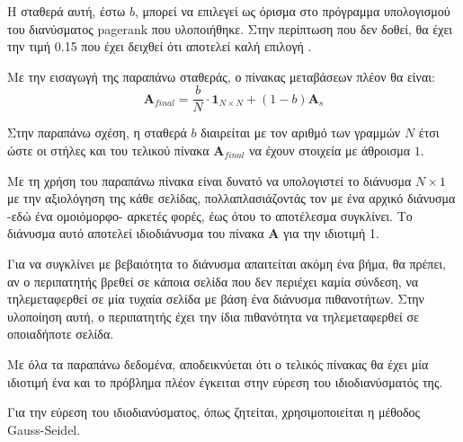 Η σταθερά αυτή, έστω $b$, μπορεί να επιλεγεί ως όρισμα στο πρόγραμμα υπολογισμού του διανύσματος pagerank που υλοποιήθηκε. Στην περίπτωση που δεν δοθεί, θα έχει την τιμή 0.15 που έχει δειχθεί ότι αποτελεί καλή επιλογή \parencite{brin1998anatomy}.

Με την εισαγωγή της παραπάνω σταθεράς, ο πίνακας μεταβάσεων πλέον θα είναι:
\[
  \bm{A}_{final} = \frac{b}{N}\cdot\bm{1}_{N\times N}+(1-b)\bm{A}_s
\]

Στην παραπάνω σχέση, η σταθερά $b$ διαιρείται με τον αριθμό των γραμμών $N$ έτσι ώστε οι στήλες και του τελικού πίνακα $\bm{A}_{final}$ να έχουν στοιχεία με άθροισμα $1$.

Με τη χρήση του παραπάνω πίνακα είναι δυνατό να υπολογιστεί το διάνυσμα $N\times1$ με την αξιολόγηση της κάθε σελίδας, πολλαπλασιάζοντάς τον με ένα αρχικό διάνυσμα -εδώ ένα ομοιόμορφο- αρκετές φορές, έως ότου το αποτέλεσμα συγκλίνει. Το διάνυσμα αυτό αποτελεί ιδιοδιάνυσμα του πίνακα $\bm{A}$ για την ιδιοτιμή 1.

Για να συγκλίνει με βεβαιότητα το διάνυσμα απαιτείται ακόμη ένα βήμα, θα πρέπει, αν ο περιπατητής βρεθεί σε κάποια σελίδα που δεν περιέχει καμία σύνδεση, να τηλεμεταφερθεί σε μία τυχαία σελίδα με βάση ένα διάνυσμα πιθανοτήτων. Στην υλοποίηση αυτή, ο περιπατητής έχει την ίδια πιθανότητα να τηλεμεταφερθεί σε οποιαδήποτε σελίδα.

Με όλα τα παραπάνω δεδομένα, αποδεικνύεται ότι ο τελικός πίνακας θα έχει μία ιδιοτιμή ένα και το πρόβλημα πλέον έγκειται στην εύρεση του ιδιοδιανύσματός της.

Για την εύρεση του ιδιοδιανύσματος, όπως ζητείται, χρησιμοποιείται η μέθοδος Gauss-Seidel.

